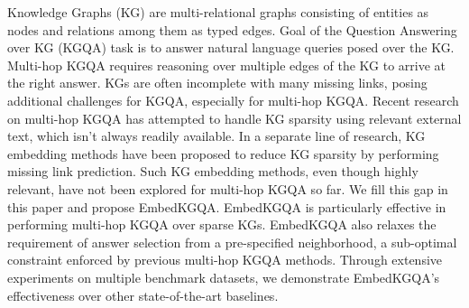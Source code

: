 Knowledge Graphs (KG) are multi-relational graphs consisting of entities as nodes and relations among them as typed edges. Goal of the Question Answering over KG (KGQA) task is to answer natural language queries posed over the KG. Multi-hop  KGQA requires reasoning over multiple edges of the KG to arrive at the right answer. KGs are often incomplete with many missing links, posing  additional challenges for KGQA, especially for multi-hop KGQA. Recent research on multi-hop KGQA has attempted to handle KG sparsity using relevant external text, which isn't always readily available. In a separate line of research, KG embedding methods have been proposed to reduce KG sparsity by performing missing link prediction. Such KG embedding methods, even though highly relevant, have not been explored for multi-hop KGQA so far. We fill this gap in this paper and propose EmbedKGQA. EmbedKGQA is particularly effective in performing multi-hop KGQA over sparse KGs. EmbedKGQA also relaxes the requirement of answer selection from a pre-specified neighborhood, a sub-optimal constraint enforced by previous multi-hop KGQA methods. Through extensive experiments on multiple benchmark datasets, we demonstrate EmbedKGQA's effectiveness over other state-of-the-art baselines.
